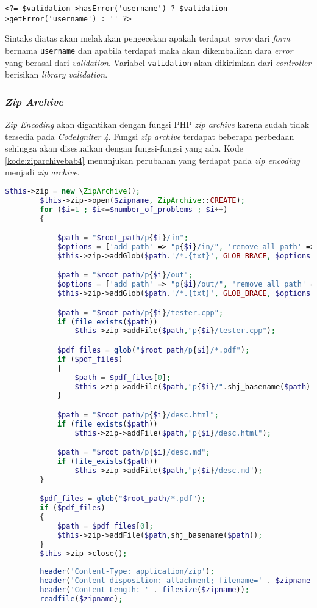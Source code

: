 \begin{center}
\verb|<?= $validation->hasError('username') ? $validation->getError('username') : '' ?>|
\end{center}

Sintaks diatas akan melakukan pengecekan apakah terdapat \textit{error} dari \textit{form} bernama \texttt{username} dan apabila terdapat maka akan dikembalikan dara \textit{error} yang berasal dari \textit{validation}. Variabel \texttt{validation} akan dikirimkan dari \textit{controller} berisikan \textit{library validation}.

\subsubsection{\textit{Zip Archive}}
\textit{Zip Encoding} akan digantikan dengan fungsi PHP \textit{zip archive} karena sudah tidak tersedia pada \textit{CodeIgniter 4}. Fungsi \textit{zip archive} terdapat beberapa perbedaan sehingga akan disesuaikan dengan fungsi-fungsi yang ada. Kode \ref{kode:ziparchivebab4} menunjukan perubahan yang terdapat pada \textit{zip encoding} menjadi \textit{zip archive}.

\begin{lstlisting}[language=PHP, caption=Perancangan perubahan \textit{zip encoding} menjadi \textit{zip archive}, label=kode:ziparchivebab4]
$this->zip = new \ZipArchive();
		$this->zip->open($zipname, ZipArchive::CREATE);
		for ($i=1 ; $i<=$number_of_problems ; $i++)
		{

			$path = "$root_path/p{$i}/in";
			$options = ['add_path' => "p{$i}/in/", 'remove_all_path' => TRUE];
			$this->zip->addGlob($path.'/*.{txt}', GLOB_BRACE, $options);

			$path = "$root_path/p{$i}/out";
			$options = ['add_path' => "p{$i}/out/", 'remove_all_path' => TRUE];
			$this->zip->addGlob($path.'/*.{txt}', GLOB_BRACE, $options);

			$path = "$root_path/p{$i}/tester.cpp";
			if (file_exists($path))
				$this->zip->addFile($path,"p{$i}/tester.cpp");

			$pdf_files = glob("$root_path/p{$i}/*.pdf");
			if ($pdf_files)
			{
				$path = $pdf_files[0];
				$this->zip->addFile($path,"p{$i}/".shj_basename($path));
			}

			$path = "$root_path/p{$i}/desc.html";
			if (file_exists($path))
				$this->zip->addFile($path,"p{$i}/desc.html");

			$path = "$root_path/p{$i}/desc.md";
			if (file_exists($path))
				$this->zip->addFile($path,"p{$i}/desc.md");
		}

		$pdf_files = glob("$root_path/*.pdf");
		if ($pdf_files)
		{
			$path = $pdf_files[0];
			$this->zip->addFile($path,shj_basename($path));
		}
		$this->zip->close();
		
		header('Content-Type: application/zip');
		header('Content-disposition: attachment; filename=' . $zipname);
		header('Content-Length: ' . filesize($zipname));
		readfile($zipname);
\end{lstlisting}

